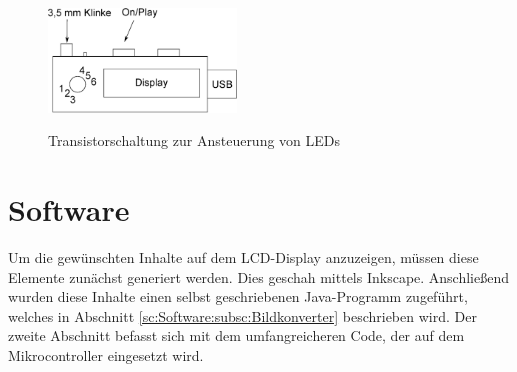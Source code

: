 \documentclass[journal, a4paper]{IEEEtran}
\begin{document}
		\begin{figure}
			\begin{center}
				\label{fig:mp3-Player}
				\includegraphics[width=5cm]{./Grafiken/mp3Player.eps}
				\caption{Transistorschaltung zur Ansteuerung von LEDs}
			\end{center}
		\end{figure}	
\section{Software}
	Um die gewünschten Inhalte auf dem LCD-Display anzuzeigen, müssen diese Elemente zunächst generiert werden. Dies geschah mittels Inkscape. Anschließend wurden diese Inhalte einen selbst geschriebenen Java-Programm zugeführt, welches in Abschnitt \ref{sc:Software:subsc:Bildkonverter} beschrieben wird. Der zweite Abschnitt befasst sich mit dem umfangreicheren Code, der auf dem Mikrocontroller eingesetzt wird.
\end{document}

